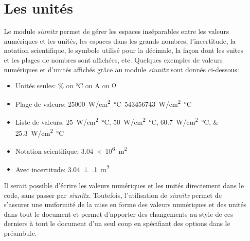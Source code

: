 \documentclass[../exemple_master.tex]{subfiles}
\begin{document}
\section{Les unités}

Le module \emph{siunitx} permet de gérer les espaces inséparables entre les valeurs numériques et les unités, les espaces dans les grands nombres, l'incertitude, la notation scientifique, le symbole utilisé pour la décimale, la façon dont les suites et les plages de nombres sont affichées, etc. Quelques exemples de valeurs numériques et d'unités affichés grâce au module \emph{siunitx} sont donnés ci-dessous: 

\begin{itemize}
\item Unités seules: \si{\percent} ou \si{\celsius} ou \si{\ampere} ou \si{\ohm}
\item Plage de valeurs: \SIrange{25000}{543456743}{W/cm^2 \celsius}
\item Liste de valeurs: \SIlist{25;50;60.7;25.3}{W/cm^2 \celsius}
\item Notation scientifique: \SI{3.04e6}{m^2}
\item Avec incertitude: \SI{3.04(10)}{m^2}
\end{itemize}

Il serait possible d'écrire les valeurs numériques et les unités directement dans le code, sans passer par \emph{siunitx}. Toutefois, l'utilisation de \emph{siunitx} permet de s'assurer une uniformité de la mise en forme des valeurs numériques et des unités dans tout le document et permet d'apporter des changements au style de ces derniers à tout le document d'un seul coup en spécifiant des options dans le préambule.
\end{document}
